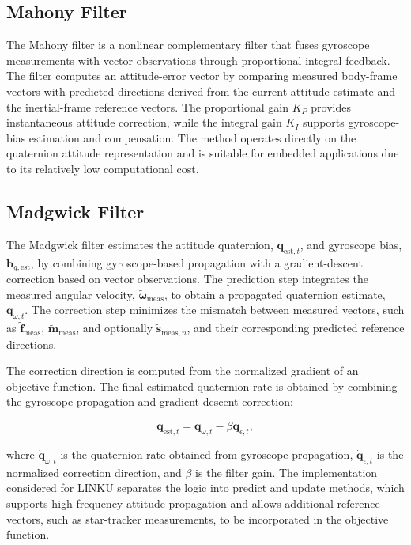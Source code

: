 \subsection{Mahony Filter}
\label{app:adcs_mahony_filter}

The Mahony filter is a nonlinear complementary filter that fuses gyroscope measurements with vector observations through proportional-integral feedback. The filter computes an attitude-error vector by comparing measured body-frame vectors with predicted directions derived from the current attitude estimate and the inertial-frame reference vectors. The proportional gain \(K_P\) provides instantaneous attitude correction, while the integral gain \(K_I\) supports gyroscope-bias estimation and compensation. The method operates directly on the quaternion attitude representation and is suitable for embedded applications due to its relatively low computational cost.

\subsection{Madgwick Filter}
\label{app:adcs_madgwick_filter}

The Madgwick filter estimates the attitude quaternion, \(\mathbf{q}_{\mathrm{est},t}\), and gyroscope bias, \(\mathbf{b}_{g,\mathrm{est}}\), by combining gyroscope-based propagation with a gradient-descent correction based on vector observations. The prediction step integrates the measured angular velocity, \(\tilde{\boldsymbol{\omega}}_{\mathrm{meas}}\), to obtain a propagated quaternion estimate, \(\mathbf{q}_{\omega,t}\). The correction step minimizes the mismatch between measured vectors, such as \(\tilde{\mathbf{f}}_{\mathrm{meas}}\), \(\tilde{\mathbf{m}}_{\mathrm{meas}}\), and optionally \(\tilde{\mathbf{s}}_{\mathrm{meas},n}\), and their corresponding predicted reference directions.

The correction direction is computed from the normalized gradient of an objective function. The final estimated quaternion rate is obtained by combining the gyroscope propagation and gradient-descent correction:

\begin{equation}
    \dot{\mathbf{q}}_{\mathrm{est},t}
    =
    \dot{\mathbf{q}}_{\omega,t}
    -
    \beta
    \dot{\mathbf{q}}_{\epsilon,t},
    \label{eq:app_adcs_madgwick_estimated_rate}
\end{equation}

where \(\dot{\mathbf{q}}_{\omega,t}\) is the quaternion rate obtained from gyroscope propagation, \(\dot{\mathbf{q}}_{\epsilon,t}\) is the normalized correction direction, and \(\beta\) is the filter gain. The implementation considered for LINKU separates the logic into predict and update methods, which supports high-frequency attitude propagation and allows additional reference vectors, such as star-tracker measurements, to be incorporated in the objective function.

